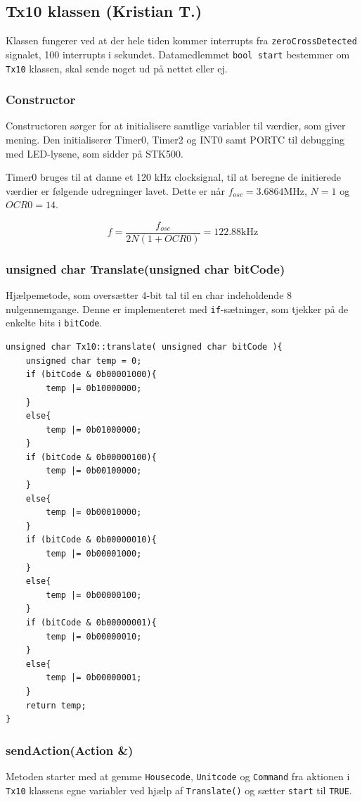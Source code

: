 \subsection{Tx10 klassen (Kristian T.)}

Klassen fungerer ved at der hele tiden kommer interrupts fra \texttt{zeroCrossDetected} signalet, 100 interrupts i sekundet. Datamedlemmet \texttt{bool start} bestemmer om \texttt{Tx10} klassen, skal sende noget ud på nettet eller ej.

\subsubsection{Constructor}
Constructoren sørger for at initialisere samtlige variabler til værdier, som giver mening. Den initialiserer Timer0, Timer2 og INT0 samt PORTC til debugging med LED-lysene, som sidder på STK500.

Timer0 bruges til at danne et 120 kHz clocksignal, til at beregne de initierede værdier er følgende udregninger lavet. Dette er når $f_{osc} = 3.6864 \text{MHz}$, $N = 1$ og $OCR0 = 14$. 

\begin{displaymath}
f = \frac{f_{osc}}{2 N (1 + OCR0)} = 122.88 \text{kHz}
\end{displaymath}

\subsubsection{unsigned char Translate(unsigned char bitCode)}

Hjælpemetode, som oversætter 4-bit tal til en char indeholdende 8 nulgennemgange. Denne er implementeret med \texttt{if}-sætninger, som tjekker på de enkelte bits i \texttt{bitCode}.

\begin{lstlisting}
unsigned char Tx10::translate( unsigned char bitCode ){
	unsigned char temp = 0;
	if (bitCode & 0b00001000){
		temp |= 0b10000000;
	}
	else{
		temp |= 0b01000000;
	}
	if (bitCode & 0b00000100){
		temp |= 0b00100000;
	}
	else{
		temp |= 0b00010000;
	}
	if (bitCode & 0b00000010){
		temp |= 0b00001000;
	}
	else{
		temp |= 0b00000100;
	}
	if (bitCode & 0b00000001){
		temp |= 0b00000010;
	}
	else{
		temp |= 0b00000001;
	}
	return temp;
}
\end{lstlisting}

\subsubsection{sendAction(Action \&)}
Metoden starter med at gemme \texttt{Housecode}, \texttt{Unitcode} og \texttt{Command} fra aktionen i \texttt{Tx10} klassens egne variabler ved hjælp af \texttt{Translate()} og sætter \texttt{start} til \texttt{TRUE}.


